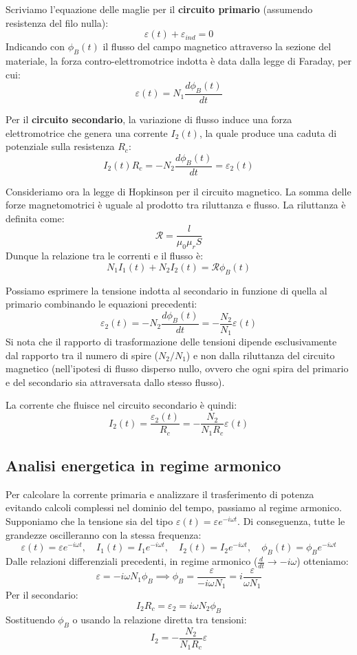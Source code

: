 \documentclass{book}
\begin{document}
Scriviamo l'equazione delle maglie per il \textbf{circuito primario} (assumendo resistenza del filo nulla):
$$
\varepsilon(t) + \varepsilon_{ind}= 0 
$$
Indicando con $\phi_B(t)$ il flusso del campo magnetico attraverso la sezione del materiale, la forza contro-elettromotrice indotta è data dalla legge di Faraday, per cui:
$$
\varepsilon(t) = N_1 \frac{d \phi_B(t)}{dt}
$$

Per il \textbf{circuito secondario}, la variazione di flusso induce una forza elettromotrice che genera una corrente $I_2(t)$, la quale produce una caduta di potenziale sulla resistenza $R_c$:
$$
I_2(t) R_c = -N_2 \frac{d \phi_B(t)}{dt} = \varepsilon_2(t)
$$

Consideriamo ora la legge di Hopkinson per il circuito magnetico. La somma delle forze magnetomotrici è uguale al prodotto tra riluttanza e flusso. La riluttanza è definita come:
$$
\mathcal{R} = \frac{l}{\mu_0 \mu_r S}
$$
Dunque la relazione tra le correnti e il flusso è:
$$
N_1 I_1(t) + N_2 I_2(t) = \mathcal{R} \phi_B(t)
$$

Possiamo esprimere la tensione indotta al secondario in funzione di quella al primario combinando le equazioni precedenti:
$$
\varepsilon_2(t)=  -N_2 \frac{d \phi_B(t)}{dt} = - \frac{N_2}{N_1} \varepsilon(t)
$$
Si nota che il rapporto di trasformazione delle tensioni dipende esclusivamente dal rapporto tra il numero di spire ($N_2/N_1$) e non dalla riluttanza del circuito magnetico (nell'ipotesi di flusso disperso nullo, ovvero che ogni spira del primario e del secondario sia attraversata dallo stesso flusso).

La corrente che fluisce nel circuito secondario è quindi:
$$
I_2(t)= \frac{\varepsilon_2(t)}{R_c}= - \frac{N_2}{N_1 R_c}\varepsilon(t)
$$

\subsection{Analisi energetica in regime armonico}

Per calcolare la corrente primaria e analizzare il trasferimento di potenza evitando calcoli complessi nel dominio del tempo, passiamo al regime armonico. Supponiamo che la tensione sia del tipo $\varepsilon(t) = \varepsilon e^{-i\omega t}$. Di conseguenza, tutte le grandezze oscilleranno con la stessa frequenza:
$$
\varepsilon(t)= \varepsilon e^{- i \omega t}, \quad I_1(t)= I_1 e^{- i \omega t}, \quad I_2(t)= I_2 e^{- i \omega t}, \quad \phi_B(t)= \phi_B e^{-i \omega t}
$$ 
Dalle relazioni differenziali precedenti, in regime armonico ($\frac{d}{dt} \to -i\omega$) otteniamo:
$$
\varepsilon = -i\omega N_1 \phi_B \implies \phi_B = \frac{\varepsilon}{-i\omega N_1} = i \frac{\varepsilon}{\omega N_1}
$$
Per il secondario:
$$ 
I_2 R_c = \varepsilon_2 = i \omega N_2 \phi_B 
$$
Sostituendo $\phi_B$ o usando la relazione diretta tra tensioni:
$$
I_2 = - \frac{N_2}{N_1 R_c} \varepsilon
$$
\end{document}

